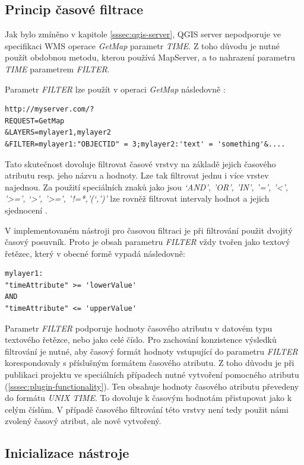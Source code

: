 \subsection{Princip časové filtrace}
\label{sssec:time-filtration}

Jak bylo zmíněno v kapitole \ref{sssec:qgis-server}, QGIS server nepodporuje ve specifikaci WMS operace \textit{GetMap} parametr \textit{TIME}. Z toho důvodu je nutné
použít obdobnou metodu, kterou používá MapServer, a to nahrazení
parametru \textit{TIME} parametrem \textit{FILTER}.

\noindent
Parametr \textit{FILTER} lze použít v operaci \textit{GetMap} následovně
\cite{qgis-service}:
\begin{verbatim}
http://myserver.com/?
REQUEST=GetMap
&LAYERS=mylayer1,mylayer2
&FILTER=mylayer1:"OBJECTID" = 3;mylayer2:'text' = 'something'&....
\end{verbatim}

Tato skutečnost dovoluje filtrovat časové vrstvy na základě jejich
časového atributu resp. jeho názvu a hodnoty. Lze tak filtrovat jednu
i více vrstev najednou. Za použití speciálních znaků jako jsou
\textit{‘AND’, ’OR’, ’IN’, ’=’, ’<’, ’>=’,  ‘>’,
’>=’, ’!=*,’(‘,’)’} lze rovněž filtrovat intervaly hodnot
a jejich sjednocení \cite{qgis-service}.

V implementovaném nástroji pro časovou filtraci je při filtrování použit
dvojitý časový posuvník. Proto je obsah parametru \textit{FILTER} vždy
tvořen jako textový řetězec, který v obecné formě vypadá následovně:

\begin{verbatim}
mylayer1:
"timeAttribute" >= 'lowerValue'
AND
"timeAttribute" <= 'upperValue'
\end{verbatim}

Parametr \textit{FILTER} podporuje hodnoty časového atributu v datovém
typu textového řetězce, nebo jako celé číslo. Pro zachování
konzistence výsledků filtrování je nutné, aby časový formát hodnoty
vstupující do parametru \textit{FILTER} korespondovaly s příslušným
formátem časového atributu. Z toho důvodu je při publikaci projektu
ve speciálních případech nutné vytvoření pomocného atributu
(\ref{sssec:plugin-functionality}). Ten obsahuje hodnoty časového atributu
převedeny do formátu \textit{UNIX TIME}. To dovoluje k časovým hodnotám
přistupovat jako k celým číslům. V případě časového filtrování
této vrstvy není tedy použit námi zvolený časový atribut, ale nově
vytvořený.

\subsection{Inicializace nástroje}
\label{sssec:initialization}

